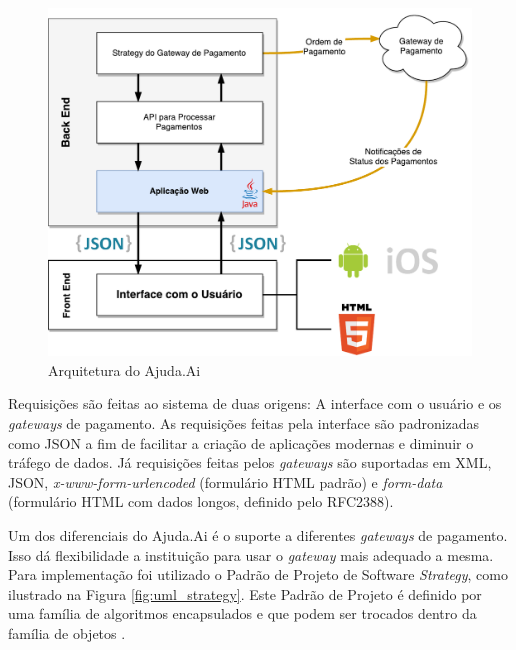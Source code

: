 \begin{figure}[H]
  \caption{\label{fig:arquitetura}Arquitetura do Ajuda.Ai}
  \centering
  \includegraphics[scale=0.7]{imagens/ajudaAi-arquitetura.pdf}
\end{figure}

Requisições são feitas ao sistema de duas origens: A interface com o usuário e os \emph{gateways} de pagamento. As requisições feitas pela interface são padronizadas como JSON a fim de facilitar a criação de aplicações modernas e diminuir o tráfego de dados. Já requisições feitas pelos \emph{gateways} são suportadas em XML, JSON, \emph{x-www-form-urlencoded} (formulário HTML padrão) e \emph{form-data} (formulário HTML com dados longos, definido pelo RFC2388).

Um dos diferenciais do Ajuda.Ai é o suporte a diferentes \emph{gateways} de pagamento. Isso dá flexibilidade a instituição para usar o \emph{gateway} mais adequado a mesma. Para implementação foi utilizado o Padrão de Projeto de Software \emph{Strategy}, como ilustrado na Figura \ref{fig:uml_strategy}. Este Padrão de Projeto é definido por uma família de algoritmos encapsulados e que podem ser trocados dentro da família de objetos \cite{gamma1995design}.

